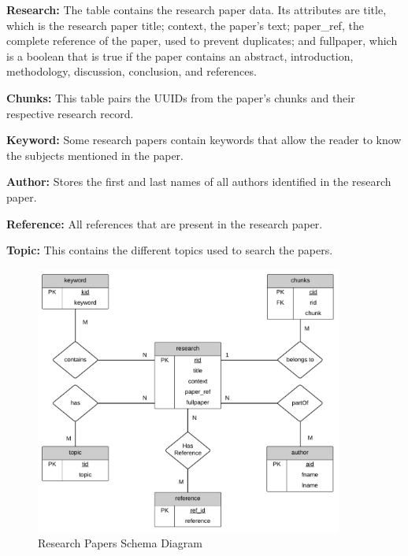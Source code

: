 \begin{description}
	\item{\textbf{Research:}}  The table contains the research paper data. Its attributes are title, which is the research paper title; context, the paper’s text; paper\_ref, the complete reference of the paper, used to prevent duplicates; and fullpaper, which is a boolean that is true if the paper contains an abstract, introduction, methodology, discussion, conclusion, and references.
	\item{\textbf{Chunks:}} This table pairs the UUIDs from the paper's chunks and their respective research record.  
	\item{\textbf{Keyword:}} Some research papers contain keywords that allow the reader to know the subjects mentioned in the paper. 
	\item{\textbf{Author:}} Stores the first and last names of all authors identified in the research paper. 
	\item{\textbf{Reference:}} All references that are present in the research paper.
	\item{\textbf{Topic:}} This contains the different topics used to search the papers.

\end{description}

\begin{figure}[H]
	\begin{center}
		\includegraphics[width=0.9\textwidth]{images/Table_diagram.png} %
	\end{center}
	\caption{Research Papers Schema Diagram} %
	\label{fig:table}
\end{figure}


